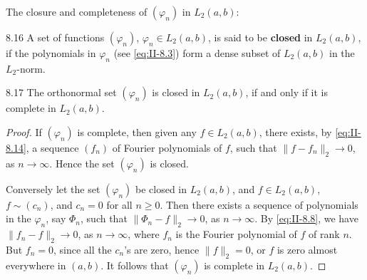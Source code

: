 The closure and completeness of $(\varphi_{n})$ in $L_{2}(a,b)$:
\begin{nstmt}{8.16}\label{eq:II-8.16}
A set of functions $(\varphi_{n})$, $\varphi_{n}\in L_{2}(a,b)$, is said to be \textbf{closed} in $L_{2}(a,b)$, if the polynomials in $\varphi_{n}$ (see \eqref{eq:II-8.3}) form a dense subset of $L_{2}(a,b)$ in the $L_{2}$-norm.
\end{nstmt}
\begin{nstmt}{8.17}\label{eq:II-8.17}
The orthonormal set $(\varphi_{n})$ is closed in $L_{2}(a,b)$, if and only if it is complete in $L_{2}(a,b)$.
\end{nstmt}
\begin{proof}
If $(\varphi_{n})$ is complete, then given any $f\in L_{2}(a,b)$, there exists, by \eqref{eq:II-8.14}, a sequence $(f_{n})$ of Fourier polynomials of $f$, such that $\|f-f_{n}\|_{2}\to 0$, as $n\to\infty$. Hence the set $(\varphi_{n})$ is closed.

Conversely let the set $(\varphi_{n})$ be closed in $L_{2}(a,b)$, and $f\in L_{2}(a,b)$, $f\sim(c_{n})$, and $c_{n}=0$ for all $n\ge 0$. Then there exists a sequence of polynomials in the $\varphi_{n}$, say $\Phi_{n}$, such that $\|\Phi_{n}-f\|_{2}\to 0$, as $n\to\infty$. By \eqref{eq:II-8.8}, we have $\|f_{n}-f\|_{2}\to 0$, as $n\to\infty$, where $f_{n}$ is the Fourier polynomial of $f$ of rank $n$. But $f_{n}=0$, since all the $c_{n}$'s are zero, hence $\|f\|_{2}=0$, or $f$ is zero almost everywhere in $(a,b)$. It follows that $(\varphi_{n})$ is complete in $L_{2}(a,b)$.
\end{proof}

